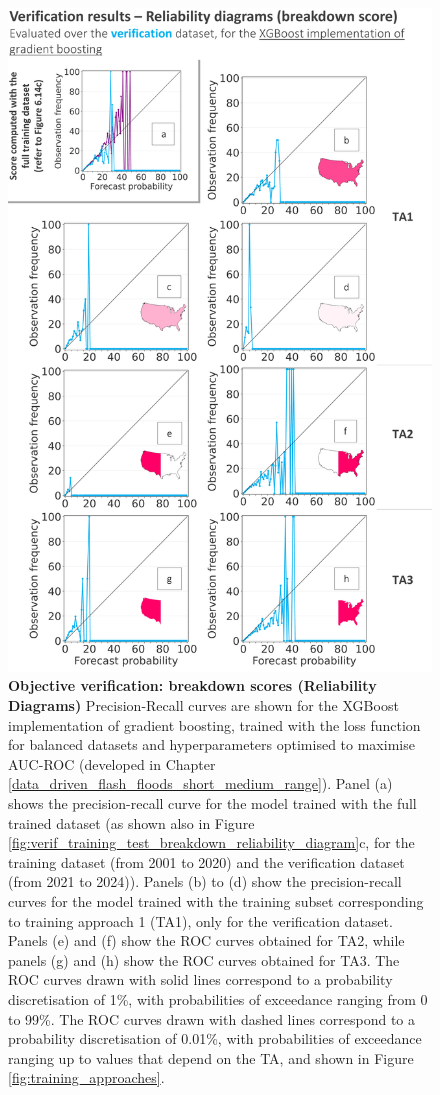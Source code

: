 \begin{figure}[htbp]
\centering
\includegraphics[scale = 0.95]{verif_breakdown_scores_reliability_diagram.png}
\caption{\textbf{Objective verification: breakdown scores (Reliability Diagrams)} Precision-Recall curves are shown for the XGBoost implementation of gradient boosting, trained with the loss function for balanced datasets and hyperparameters optimised to maximise AUC-ROC (developed in Chapter \ref{data_driven_flash_floods_short_medium_range}). Panel (a) shows the precision-recall curve for the model trained with the full trained dataset (as shown also in Figure \ref{fig:verif_training_test_breakdown_reliability_diagram}c, for the \textcolor{colourTraining}{training} dataset (from 2001 to 2020) and the \textcolor{colourTest}{verification} dataset (from 2021 to 2024)). Panels (b) to (d) show the precision-recall curves for the model trained with the training subset corresponding to training approach 1 (TA1), only for the \textcolor{colourTest}{verification} dataset. Panels (e) and (f) show the ROC curves obtained for TA2, while panels (g) and (h) show the ROC curves obtained for TA3. The ROC curves drawn with solid lines correspond to a probability discretisation of 1\%, with probabilities of exceedance ranging from 0 to 99\%. The ROC curves drawn with dashed lines correspond to a probability discretisation of 0.01\%, with probabilities of exceedance ranging up to values that depend on the TA, and shown in Figure \ref{fig:training_approaches}.}
\label{fig:verif_breakdown_scores_reliability_diagram}
\end{figure}